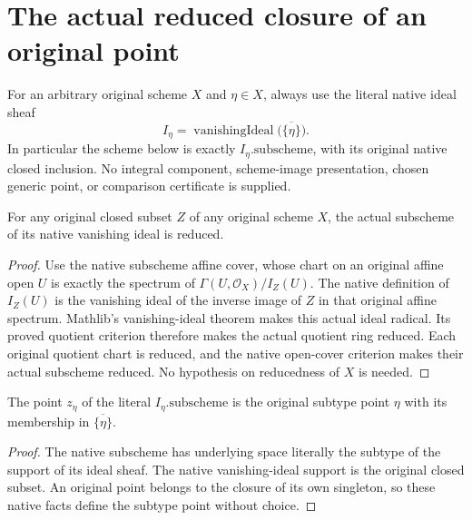 \section{The actual reduced closure of an original point}

For an arbitrary original scheme $X$ and $\eta\in X$, always use the literal
native ideal sheaf
\[
 I_\eta=\operatorname{vanishingIdeal}
   \bigl(\overline{\{\eta\}}\bigr).
\]
In particular the scheme below is exactly $I_\eta.\mathrm{subscheme}$,
with its original native closed inclusion. No integral component, scheme-image
presentation, chosen generic point, or comparison certificate is supplied.

\begin{lemma}
\label{lem:scheme-point-closure-vanishing-reduced}
\leanok
For any original closed subset $Z$ of any original scheme $X$, the actual
subscheme of its native vanishing ideal is reduced.
\end{lemma}
\begin{proof}
Use the native subscheme affine cover, whose chart on an original affine
open $U$ is exactly the spectrum of
$\Gamma(U,\mathcal O_X)/I_Z(U)$. The native definition of $I_Z(U)$ is the
vanishing ideal of the inverse image of $Z$ in that original affine spectrum.
Mathlib's vanishing-ideal theorem makes this actual ideal radical. Its proved
quotient criterion therefore makes the actual quotient ring reduced.
Each original quotient chart is reduced, and the native open-cover criterion
makes their actual subscheme reduced. No hypothesis on reducedness of $X$
is needed.
\end{proof}

\begin{definition}
\label{def:scheme-point-closure-canonical-lift}
\leanok
The point $z_\eta$ of the literal $I_\eta.\mathrm{subscheme}$ is the original
subtype point $\eta$ with its membership in $\overline{\{\eta\}}$.
\end{definition}
\begin{proof}
The native subscheme has underlying space literally the subtype of the
support of its ideal sheaf. The native vanishing-ideal support is the original
closed subset. An original point belongs to the closure of its own singleton,
so these native facts define the subtype point without choice.
\end{proof}

